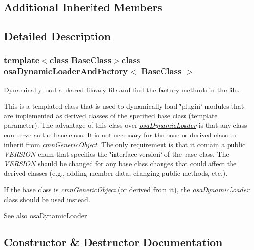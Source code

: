 \subsection*{Additional Inherited Members}


\subsection{Detailed Description}
\subsubsection*{template$<$class Base\+Class$>$class osa\+Dynamic\+Loader\+And\+Factory$<$ Base\+Class $>$}

Dynamically load a shared library file and find the factory methods in the file. 

This is a templated class that is used to dynamically load \char`\"{}plugin\char`\"{} modules that are implemented as derived classes of the specified base class (template parameter). The advantage of this class over {\itshape \hyperlink{classosa_dynamic_loader}{osa\+Dynamic\+Loader}} is that any class can serve as the base class. It is not necessary for the base or derived class to inherit from {\itshape \hyperlink{classcmn_generic_object}{cmn\+Generic\+Object}}. The only requirement is that it contain a public {\itshape V\+E\+R\+S\+I\+O\+N} enum that specifies the \char`\"{}interface version\char`\"{} of the base class. The {\itshape V\+E\+R\+S\+I\+O\+N} should be changed for any base class changes that could affect the derived classes (e.\+g., adding member data, changing public methods, etc.).

If the base class is {\itshape \hyperlink{classcmn_generic_object}{cmn\+Generic\+Object}} (or derived from it), the {\itshape \hyperlink{classosa_dynamic_loader}{osa\+Dynamic\+Loader}} class should be used instead.

\begin{DoxySeeAlso}{See also}
\hyperlink{classosa_dynamic_loader}{osa\+Dynamic\+Loader} 
\end{DoxySeeAlso}


\subsection{Constructor \& Destructor Documentation}
\hypertarget{classosa_dynamic_loader_and_factory_a62c5ebb6a73695309d35e234c5364aca}{}
